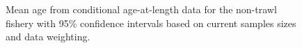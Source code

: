 \documentclass[
]{scrartcl}
\begin{document}
\begin{figure}[H]


\caption{\label{fig-nontrawl-mean-caal}Mean age from conditional
age-at-length data for the non-trawl fishery with 95\% confidence
intervals based on current samples sizes and data weighting.}

\end{figure}%
\end{document}
